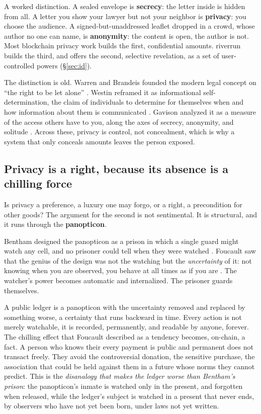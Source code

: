 \documentclass[11pt]{article}
\begin{document}
\begin{intuition}
A worked distinction. A sealed envelope is \textbf{secrecy}: the letter inside is hidden
from all. A letter you show your lawyer but not your neighbor is \textbf{privacy}: you
choose the audience. A signed-but-unaddressed leaflet dropped in a crowd, whose author
no one can name, is \textbf{anonymity}: the content is open, the author is not. Most
blockchain privacy work builds the first, confidential amounts. riverrun builds the
third, and offers the second, selective revelation, as a set of user-controlled powers
(\S\ref{sec:id}).
\end{intuition}

The distinction is old. Warren and Brandeis founded the modern legal concept on ``the
right to be let alone'' \cite{warrenbrandeis}. Westin reframed it as informational
self-determination, the claim of individuals to determine for themselves when and how
information about them is communicated \cite{westin}. Gavison analyzed it as a measure
of the access others have to you, along the axes of secrecy, anonymity, and solitude
\cite{gavison}. Across these, privacy is control, not concealment, which is why a system
that only conceals amounts leaves the person exposed.

\subsection{Privacy is a right, because its absence is a chilling force}

Is privacy a preference, a luxury one may forgo, or a right, a precondition for other
goods? The argument for the second is not sentimental. It is structural, and it runs
through the \textbf{panopticon}.

Bentham designed the panopticon as a prison in which a single guard might watch any
cell, and no prisoner could tell when they were watched \cite{bentham}. Foucault saw
that the genius of the design was not the watching but the \emph{uncertainty} of it: not
knowing when you are observed, you behave at all times as if you are \cite{foucault}. The
watcher's power becomes automatic and internalized. The prisoner guards themselves.

A public ledger is a panopticon with the uncertainty removed and replaced by something
worse, a certainty that runs backward in time. Every action is not merely watchable, it
is recorded, permanently, and readable by anyone, forever. The chilling effect that
Foucault described as a tendency becomes, on-chain, a fact. A person who knows their
every payment is public and permanent does not transact freely. They avoid the
controversial donation, the sensitive purchase, the association that could be held
against them in a future whose norms they cannot predict. This is the
\emph{disanalogy that makes the ledger worse than Bentham's prison}: the panopticon's
inmate is watched only in the present, and forgotten when released, while the ledger's
subject is watched in a present that never ends, by observers who have not yet been born,
under laws not yet written.
\end{document}
